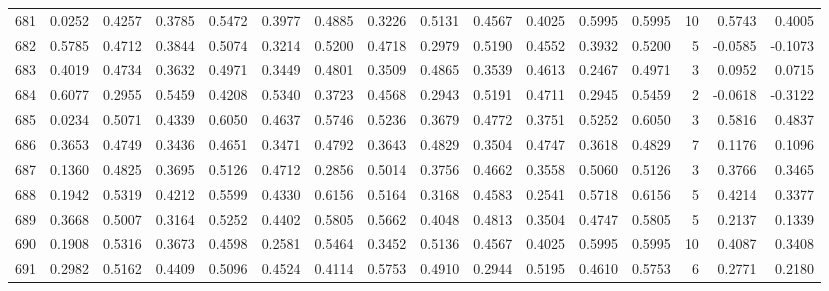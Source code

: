 \begin{tabular}{lrrrrrrrrrrrrrrr}
681 &      0.0252 &  0.4257 &  0.3785 &  0.5472 &  0.3977 &  0.4885 &  0.3226 &  0.5131 &  0.4567 &  0.4025 &   0.5995 &     0.5995 &     10 &                    0.5743 &                     0.4005 \\
682 &      0.5785 &  0.4712 &  0.3844 &  0.5074 &  0.3214 &  0.5200 &  0.4718 &  0.2979 &  0.5190 &  0.4552 &   0.3932 &     0.5200 &      5 &                   -0.0585 &                    -0.1073 \\
683 &      0.4019 &  0.4734 &  0.3632 &  0.4971 &  0.3449 &  0.4801 &  0.3509 &  0.4865 &  0.3539 &  0.4613 &   0.2467 &     0.4971 &      3 &                    0.0952 &                     0.0715 \\
684 &      0.6077 &  0.2955 &  0.5459 &  0.4208 &  0.5340 &  0.3723 &  0.4568 &  0.2943 &  0.5191 &  0.4711 &   0.2945 &     0.5459 &      2 &                   -0.0618 &                    -0.3122 \\
685 &      0.0234 &  0.5071 &  0.4339 &  0.6050 &  0.4637 &  0.5746 &  0.5236 &  0.3679 &  0.4772 &  0.3751 &   0.5252 &     0.6050 &      3 &                    0.5816 &                     0.4837 \\
686 &      0.3653 &  0.4749 &  0.3436 &  0.4651 &  0.3471 &  0.4792 &  0.3643 &  0.4829 &  0.3504 &  0.4747 &   0.3618 &     0.4829 &      7 &                    0.1176 &                     0.1096 \\
687 &      0.1360 &  0.4825 &  0.3695 &  0.5126 &  0.4712 &  0.2856 &  0.5014 &  0.3756 &  0.4662 &  0.3558 &   0.5060 &     0.5126 &      3 &                    0.3766 &                     0.3465 \\
688 &      0.1942 &  0.5319 &  0.4212 &  0.5599 &  0.4330 &  0.6156 &  0.5164 &  0.3168 &  0.4583 &  0.2541 &   0.5718 &     0.6156 &      5 &                    0.4214 &                     0.3377 \\
689 &      0.3668 &  0.5007 &  0.3164 &  0.5252 &  0.4402 &  0.5805 &  0.5662 &  0.4048 &  0.4813 &  0.3504 &   0.4747 &     0.5805 &      5 &                    0.2137 &                     0.1339 \\
690 &      0.1908 &  0.5316 &  0.3673 &  0.4598 &  0.2581 &  0.5464 &  0.3452 &  0.5136 &  0.4567 &  0.4025 &   0.5995 &     0.5995 &     10 &                    0.4087 &                     0.3408 \\
691 &      0.2982 &  0.5162 &  0.4409 &  0.5096 &  0.4524 &  0.4114 &  0.5753 &  0.4910 &  0.2944 &  0.5195 &   0.4610 &     0.5753 &      6 &                    0.2771 &                     0.2180 \\

\end{tabular}
